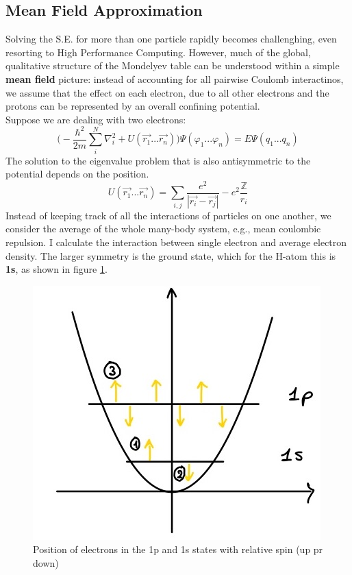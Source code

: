 \subsection{Mean Field Approximation}
Solving the S.E. for more than one particle rapidly becomes challenghing, even resorting to High Performance Computing. However, much of the global, qualitative structure of the Mondelyev table can be understood within a simple \textbf{mean field} picture: instead of accounting for all pairwise Coulomb interactinos, we assume that the effect on each electron, due to all other electrons and the protons can be represented by an overall confining potential.\\
Suppose we are dealing with two electrons:
\[
\bigg(-\frac{\hbar^2}{2m}\sum_{i}^{N}\nabla^2_i+U(\vec{r_1}...\vec{r_n})\bigg)\Psi(\varphi_1 ... \varphi_n)=E\Psi(q_1 ... q_n)
\]
The solution to the eigenvalue problem that is also antisymmetric to the potential depends on the position.
\[
U(\vec{r_1}...\vec{r_n})=\sum_{i,j}\frac{e^2}{|\vec{r_i}-\vec{r_j}|}-e^2\frac{\mathbb{Z}}{r_i}
\]
Instead of keeping track of all the interactions of particles on one another, we consider the average of the whole many-body system, e.g., mean coulombic repulsion. I calculate the interaction between single electron and average electron density. The larger symmetry is the ground state, which for the H-atom this is \textbf{1s}, as shown in figure \ref{fig:spin1}.\\
\begin{figure}[htbp!]
	\centering
	\includegraphics[scale=0.20]{img_6}
	\caption{Position of electrons in the 1p and 1s states with relative spin (up pr down)}
	\label{fig:spin1}
\end{figure}
